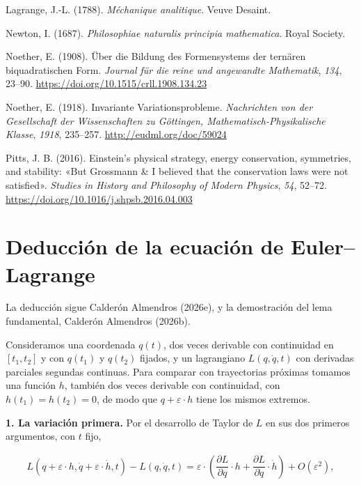 \documentclass[11pt,a4paper,spanish]{book}
\newlength{\cslhangindent}
\newenvironment{CSLReferences}[2]
 {\begin{list}{}{%
  \setlength{\itemindent}{0pt}
  \setlength{\leftmargin}{0pt}
  \setlength{\parsep}{0pt}
  \ifodd #1
   \setlength{\leftmargin}{\cslhangindent}
   \setlength{\itemindent}{-1\cslhangindent}
  \fi
  \setlength{\itemsep}{#2\baselineskip}}%
  \raggedright
  \renewcommand{\bibitem}[2][]{\item}}
 {\end{list}}
\begin{document}
\begin{CSLReferences}{1}{0}
\bibitem[\citeproctext]{ref-lagrange1788}
Lagrange, J.-L. (1788). \emph{Méchanique analitique}. Veuve Desaint.

\bibitem[\citeproctext]{ref-newton1687}
Newton, I. (1687). \emph{Philosophiae naturalis principia mathematica}.
Royal Society.

\bibitem[\citeproctext]{ref-noether1908}
Noether, E. (1908). Über die {Bildung} des {Formensystems} der ternären
biquadratischen {Form}. \emph{Journal für die reine und angewandte
Mathematik}, \emph{134}, 23--90.
\url{https://doi.org/10.1515/crll.1908.134.23}

\bibitem[\citeproctext]{ref-noether1918}
Noether, E. (1918). Invariante {Variationsprobleme}. \emph{Nachrichten
von der Gesellschaft der Wissenschaften zu Göttingen,
Mathematisch-Physikalische Klasse}, \emph{1918}, 235--257.
\url{http://eudml.org/doc/59024}

\bibitem[\citeproctext]{ref-pitts2016}
Pitts, J. B. (2016). Einstein's physical strategy, energy conservation,
symmetries, and stability: {«{But} {Grossmann} \& {I} believed that the
conservation laws were not satisfied»}. \emph{Studies in History and
Philosophy of Modern Physics}, \emph{54}, 52--72.
\url{https://doi.org/10.1016/j.shpsb.2016.04.003}

\end{CSLReferences}

\appendix

\chapter{Deducción de la ecuación de
Euler--Lagrange}\label{deducciuxf3n-de-la-ecuaciuxf3n-de-eulerlagrange}

La deducción sigue Calderón Almendros (2026e), y la demostración del
lema fundamental, Calderón Almendros (2026b).

Consideramos una coordenada \(q(t)\), dos veces derivable con
continuidad en \([t_1, t_2]\) y con \(q(t_1)\) y \(q(t_2)\) fijados, y
un lagrangiano \(L(q, \dot{q}, t)\) con derivadas parciales segundas
continuas. Para comparar con trayectorias próximas tomamos una función
\(h\), también dos veces derivable con continuidad, con
\(h(t_1) = h(t_2) = 0\), de modo que \(q + \varepsilon \cdot h\) tiene
los mismos extremos.

\textbf{1. La variación primera.} Por el desarrollo de Taylor de \(L\)
en sus dos primeros argumentos, con \(t\) fijo,

\[
\begin{aligned}
L(q + \varepsilon \cdot h, \dot{q} + \varepsilon \cdot \dot{h}, t) - L(q, \dot{q}, t) = \varepsilon \cdot \left(\dfrac{\partial L}{\partial q} \cdot h + \dfrac{\partial L}{\partial \dot{q}} \cdot \dot{h}\right) + O(\varepsilon^2),
\end{aligned}
\]
\end{document}
